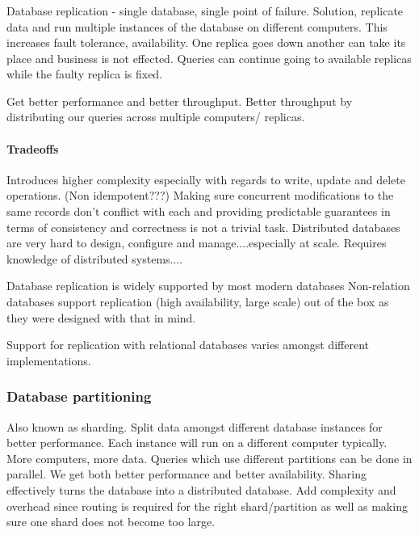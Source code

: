 \documentclass[a4paper, 11pt]{book}
\begin{document}
    \subsubsection{}
    Database replication - single database, single point of failure.
    Solution, replicate data and run multiple instances of the database on different computers.
    This increases fault tolerance, availability.
    One replica goes down another can take its place and business is not effected.
    Queries can continue going to available replicas while the faulty replica is fixed.

    Get better performance and better throughput.
    Better throughput by distributing our queries across multiple computers/ replicas.

    \paragraph{Tradeoffs}
    Introduces higher complexity especially with regards to write, update and delete operations.
    (Non idempotent???)
    Making sure concurrent modifications to the same records don't conflict with each and providing predictable guarantees in terms of consistency and correctness is not a trivial task.
    Distributed databases are very hard to design, configure and manage....especially at scale.
    Requires knowledge of distributed systems....

    Database replication is widely supported by most modern databases
    Non-relation databases support replication (high availability, large scale) out of the box as they were designed with that in mind.

    Support for replication with relational databases varies amongst different implementations.

    \subsubsection{Database partitioning}
    Also known as sharding.
    Split data amongst different database instances for better performance.
    Each instance will run on a different computer typically.
    More computers, more data.
    Queries which use different partitions can be done in parallel.
    We get both better performance and better availability.
    Sharing effectively turns the database into a distributed database.
    Add complexity and overhead since routing is required for the right shard/partition as well as making sure one shard does not become too large.
\end{document}
